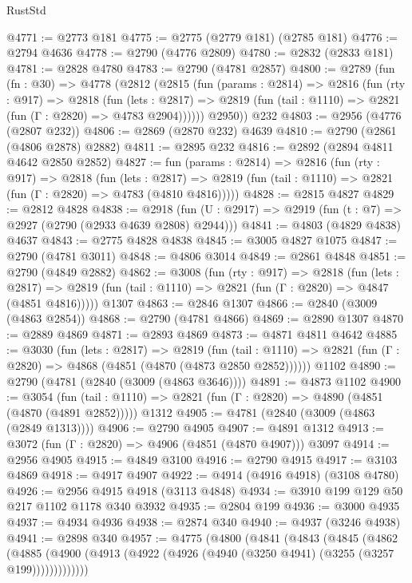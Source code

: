 \begin{lexlean}{RustStd}
\begin{coremodule}
{\begin{coremodule}
{{{{{{{{{{{{{{{{{{{{{{{{{{@4771 := @2773 @181
@4775 := @2775 (@2779 @181) (@2785 @181)
@4776 := @2794 @4636
@4778 := @2790 (@4776 @2809)
@4780 := @2832 (@2833 @181)
@4781 := @2828 @4780
@4783 := @2790 (@4781 @2857)
@4800 := @2789
    (fun (fn : @30) =>
    @4778
      (@2812
        (@2815
          (fun (params : @2814) =>
          @2816
            (fun (rty : @917) =>
            @2818
              (fun (lets : @2817) =>
              @2819 (fun (tail : @1110) => @2821 (fun (Γ : @2820) => @4783 @2904))))))
        @2950))
    @232
@4803 := @2956 (@4776 (@2807 @232))
@4806 := @2869 (@2870 @232) @4639
@4810 := @2790 (@2861 (@4806 @2878) @2882)
@4811 := @2895 @232
@4816 := @2892 (@2894 @4811 @4642 @2850 @2852)
@4827 := fun (params : @2814) =>
  @2816
    (fun (rty : @917) =>
    @2818
      (fun (lets : @2817) =>
      @2819 (fun (tail : @1110) => @2821 (fun (Γ : @2820) => @4783 (@4810 @4816)))))
@4828 := @2815 @4827
@4829 := @2812 @4828
@4838 := @2918 (fun (U : @2917) => @2919 (fun (t : @7) => @2927 (@2790 (@2933 @4639 @2808) @2944)))
@4841 := @4803 (@4829 @4838) @4637
@4843 := @2775 @4828 @4838
@4845 := @3005 @4827 @1075
@4847 := @2790 (@4781 @3011)
@4848 := @4806 @3014
@4849 := @2861 @4848
@4851 := @2790 (@4849 @2882)
@4862 := @3008
    (fun (rty : @917) =>
    @2818
      (fun (lets : @2817) =>
      @2819 (fun (tail : @1110) => @2821 (fun (Γ : @2820) => @4847 (@4851 @4816)))))
    @1307
@4863 := @2846 @1307
@4866 := @2840 (@3009 (@4863 @2854))
@4868 := @2790 (@4781 @4866)
@4869 := @2890 @1307
@4870 := @2889 @4869
@4871 := @2893 @4869
@4873 := @4871 @4811 @4642
@4885 := @3030
    (fun (lets : @2817) =>
    @2819
      (fun (tail : @1110) => @2821 (fun (Γ : @2820) => @4868 (@4851 (@4870 (@4873 @2850 @2852))))))
    @1102
@4890 := @2790 (@4781 (@2840 (@3009 (@4863 @3646))))
@4891 := @4873 @1102
@4900 := @3054
    (fun (tail : @1110) => @2821 (fun (Γ : @2820) => @4890 (@4851 (@4870 (@4891 @2852)))))
    @1312
@4905 := @4781 (@2840 (@3009 (@4863 (@2849 @1313))))
@4906 := @2790 @4905
@4907 := @4891 @1312
@4913 := @3072 (fun (Γ : @2820) => @4906 (@4851 (@4870 @4907))) @3097
@4914 := @2956 @4905
@4915 := @4849 @3100
@4916 := @2790 @4915
@4917 := @3103 @4869
@4918 := @4917 @4907
@4922 := @4914 (@4916 @4918) (@3108 @4780)
@4926 := @2956 @4915 @4918 (@3113 @4848)
@4934 := @3910 @199 @129 @50 @217 @1102 @1178 @340 @3932
@4935 := @2804 @199
@4936 := @3000 @4935
@4937 := @4934 @4936
@4938 := @2874 @340
@4940 := @4937 (@3246 @4938)
@4941 := @2898 @340
@4957 := @4775
    (@4800
      (@4841
        (@4843
          (@4845
            (@4862
              (@4885
                (@4900 (@4913 (@4922 (@4926 (@4940 (@3250 @4941) (@3255 (@3257 @199)))))))))))))
}}}}}}}}}}}}}}}}}}}}}}}}}}
\end{coremodule}}
\end{coremodule}
\end{lexlean}
